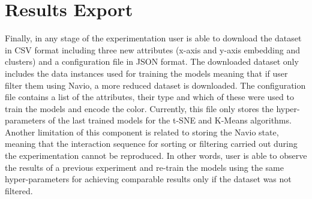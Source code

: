 \section{Results Export}
\label{section4.6}

Finally, in any stage of the experimentation user is able to download the dataset in CSV format including three new attributes (x-axis and y-axis embedding and clusters) and a configuration file in JSON format. The downloaded dataset only includes the data instances used for training the models meaning that if user filter them using Navio, a more reduced dataset is downloaded. The configuration file contains a list of the attributes, their type and which of these were used to train the models and encode the color. Currently, this file only stores the hyper-parameters of the last trained models for the t-SNE and K-Means algorithms. Another limitation of this component is related to storing the Navio state, meaning that the interaction sequence for sorting or filtering carried out during the experimentation cannot be reproduced. In other words, user is able to observe the results of a previous experiment and re-train the models using the same hyper-parameters for achieving comparable results only if the dataset was not filtered. 